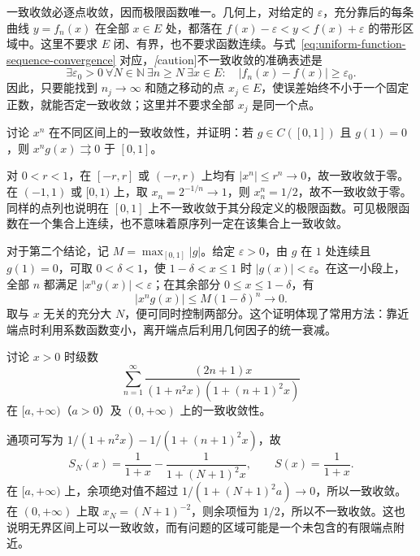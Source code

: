 \documentclass[UTF8,12pt,a4paper,fontset=fandol]{ctexbook}
\begin{document}
一致收敛必逐点收敛，因而极限函数唯一。几何上，对给定的 $\varepsilon$，充分靠后的每条曲线 $y=f_n(x)$ 在全部 $x\in E$ 处，都落在 $f(x)-\varepsilon<y<f(x)+\varepsilon$ 的带形区域中。这里不要求 $E$ 闭、有界，也不要求函数连续。与式~\eqref{eq:uniform-function-sequence-convergence} 对应，\emph[caution]{不一致收敛}的准确表述是
\begin{equation}
    \exists\varepsilon_0>0\ \forall N\in\mathbb N\ \exists n\geq N
    \ \exists x\in E:\quad |f_n(x)-f(x)|\geq\varepsilon_0.
    \label{eq:negation-of-uniform-function-convergence}
\end{equation}
因此，只要能找到 $n_j\to\infty$ 和随之移动的点 $x_j\in E$，使误差始终不小于一个固定正数，就能否定一致收敛；这里并不要求全部 $x_j$ 是同一个点。

\begin{example}
\label{ex:uniform-powers-and-endpoint-factor}
讨论 $x^n$ 在不同区间上的一致收敛性，并证明：若 $g\in C([0,1])$ 且 $g(1)=0$，则 $x^ng(x)\rightrightarrows0$ 于 $[0,1]$。
\end{example}

\begin{solve}
对 $0<r<1$，在 $[-r,r]$ 或 $(-r,r)$ 上均有 $|x^n|\leq r^n\to0$，故一致收敛于零。在 $(-1,1)$ 或 $[0,1)$ 上，取 $x_n=2^{-1/n}\to1$，则 $x_n^n=1/2$，故不一致收敛于零。同样的点列也说明在 $[0,1]$ 上不一致收敛于其分段定义的极限函数。可见极限函数在一个集合上连续，也不意味着原序列一定在该集合上一致收敛。

对于第二个结论，记 $M=\max_{[0,1]}|g|$。给定 $\varepsilon>0$，由 $g$ 在 $1$ 处连续且 $g(1)=0$，可取 $0<\delta<1$，使 $1-\delta<x\leq1$ 时 $|g(x)|<\varepsilon$。在这一小段上，全部 $n$ 都满足 $|x^ng(x)|<\varepsilon$；在其余部分 $0\leq x\leq1-\delta$，有
\[
    |x^ng(x)|\leq M(1-\delta)^n\longrightarrow0.
\]
取与 $x$ 无关的充分大 $N$，便可同时控制两部分。这个证明体现了常用方法：靠近端点时利用系数函数变小，离开端点后利用几何因子的统一衰减。
\end{solve}

\begin{example}
\label{ex:uniform-telescoping-rational-series}
讨论 $x>0$ 时级数
\[
    \sum_{n=1}^\infty
    \frac{(2n+1)x}{(1+n^2x)(1+(n+1)^2x)}
\]
在 $[a,+\infty)$（$a>0$）及 $(0,+\infty)$ 上的一致收敛性。
\end{example}

\begin{solve}
通项可写为 $1/(1+n^2x)-1/(1+(n+1)^2x)$，故
\[
    S_N(x)=\frac1{1+x}-\frac1{1+(N+1)^2x},\qquad
    S(x)=\frac1{1+x}.
\]
在 $[a,+\infty)$ 上，余项绝对值不超过 $1/(1+(N+1)^2a)\to0$，所以一致收敛。在 $(0,+\infty)$ 上取 $x_N=(N+1)^{-2}$，则余项恒为 $1/2$，所以不一致收敛。这也说明无界区间上可以一致收敛，而有问题的区域可能是一个未包含的有限端点附近。
\end{solve}
\end{document}
